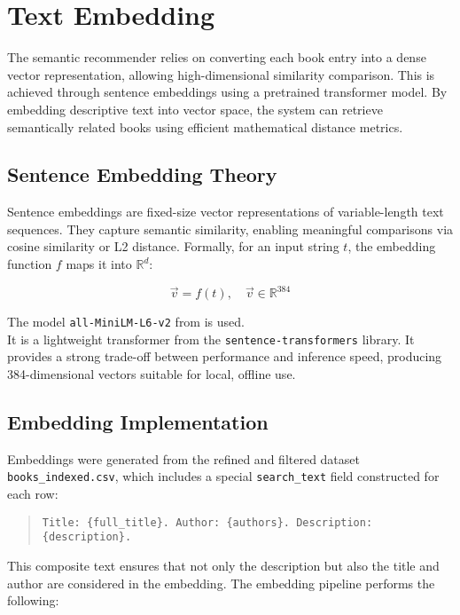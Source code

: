 \chapter{Text Embedding}
\label{chapter:embedding}

The semantic recommender relies on converting each book entry into a dense vector representation, allowing high-dimensional similarity comparison. This is achieved through sentence embeddings using a pretrained transformer model. By embedding descriptive text into vector space, the system can retrieve semantically related books using efficient mathematical distance metrics.

\section{Sentence Embedding Theory}
\label{sec:embedding-theory}

Sentence embeddings are fixed-size vector representations of variable-length text sequences. They capture semantic similarity, enabling meaningful comparisons via cosine similarity or L2 distance. Formally, for an input string $t$, the embedding function $f$ maps it into $\mathbb{R}^d$:

\[
\vec{v} = f(t), \quad \vec{v} \in \mathbb{R}^{384}
\]

The model \texttt{all-MiniLM-L6-v2} from \cite{sentence-transformers} is used.\\
It is a lightweight transformer from the \texttt{sentence-transformers} library. It provides a strong trade-off between performance and inference speed, producing 384-dimensional vectors suitable for local, offline use.

\section{Embedding Implementation}
\label{sec:embedding-implementation}

Embeddings were generated from the refined and filtered dataset \texttt{books\_indexed.csv}, which includes a special \texttt{search\_text} field constructed for each row:

{\small
\begin{quote}
\texttt{Title: \{\texttt{full\_title}\}. Author: \{\texttt{authors}\}. Description: \{\texttt{description}\}.}
\end{quote}
}

This composite text ensures that not only the description but also the title and author are considered in the embedding. The embedding pipeline performs the following:

